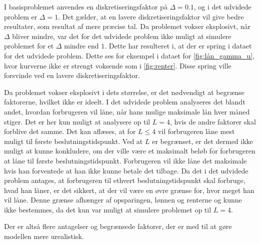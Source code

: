 I basisproblemet anvendes en diskretiseringsfaktor på $\Delta = 0.1$, og i det udvidede problem er $\Delta = 1$. Det gælder, at en lavere diskretiseringsfaktor vil give bedre resultater, som resultat af mere præcise tal. Da problemet vokser eksplosivt, når $\Delta$ bliver mindre, var det for det udvidede problem ikke muligt at simulere problemet for et $\Delta$ mindre end $1$. Dette har resulteret i, at der er spring i dataet for det udvidede problem. Dette ses for eksempel i dataet for \autoref{fig:lån_gamma_u}, hvor kurverne ikke er strengt voksende som i \autoref{fig:renter}. Disse spring ville forsvinde ved en lavere diskretiseringsfaktor.


Da problemet vokser eksplosivt i dets størrelse, er det nødvendigt at begrænse faktorerne, hvilket ikke er ideelt. I det udvidede problem analyseres det blandt andet, hvordan forbrugeren vil låne, når hans mulige maksimale lån hver måned stiger. Det er her kun muligt at analysere op til $L=4$, hvis de andre faktorer skal forblive det samme. Det kan aflæses, at for $L \leq 4$ vil forbrugeren låne mest muligt til første beslutningstidspunkt. Ved at $L$ er begrænset, er det dermed ikke muligt at kunne konkludere, om der ville være et maksimalt beløb for forbrugeren at låne til første beslutningstidspunkt. Forbrugeren vil ikke låne det maksimale hvis han forventede at han ikke kunne betale det tilbage. Da det i det udvidede problem antages, at forbrugeren til ethvert beslutningstidspunkt skal forbruge, hvad han låner, er det sikkert, at der vil være en øvre grænse for, hvor meget han vil låne. Denne grænse afhænger af opsparingen, lønnen og renterne og kunne ikke bestemmes, da det kun var muligt at simulere problemet op til $L = 4$.

Der er altså flere antagelser og begrænsede faktorer, der er med til at gøre modellen mere urealistisk.

